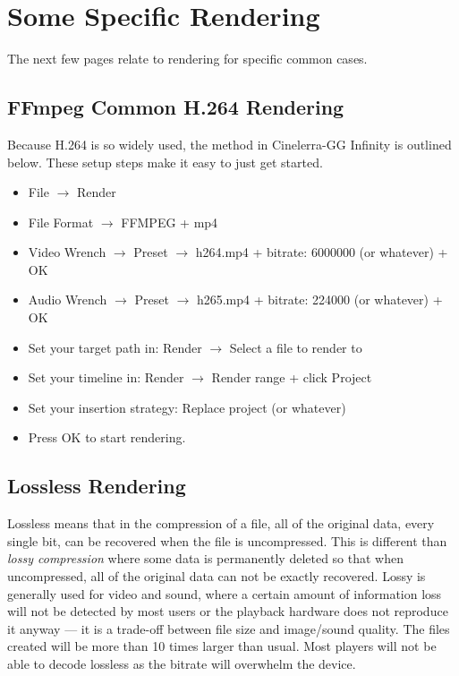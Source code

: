 \section{Some Specific Rendering}%
\label{sec:some_specific_rendering}

\noindent The next few pages relate to rendering for specific common cases.

\subsection{FFmpeg Common H.264 Rendering}%
\label{sub:ffmpeg_h264_rendering}

Because H.264 is so widely used, the method in Cinelerra-GG Infinity is outlined below.  These setup steps make it easy to just get started.

\begin{itemize}
    \item File $\rightarrow$ Render
    \item File Format $\rightarrow$ FFMPEG + mp4
    \item Video Wrench $\rightarrow$ Preset $\rightarrow$ h264.mp4 + bitrate: 6000000 (or whatever) + OK
    \item Audio Wrench $\rightarrow$ Preset $\rightarrow$ h265.mp4 + bitrate: 224000 (or whatever) + OK
    \item Set your target path in: Render $\rightarrow$ Select a file to render to
    \item Set your timeline in: Render $\rightarrow$ Render range + click Project
    \item Set your insertion strategy: Replace project (or whatever)
    \item Press OK to start rendering.
\end{itemize}

\subsection{Lossless Rendering}%
\label{sub:loseeless_rendering}

Lossless means that in the compression of a file, all of the original data, every single bit, can be recovered when the file is uncompressed.  This is different than \textit{lossy compression} where some data is permanently deleted so that when uncompressed, all of the original data can not be exactly recovered.  Lossy is generally used for video and sound, where a certain amount of information loss will not be detected by most users or the playback hardware does not reproduce it anyway --- it is a trade-off between file size and image/sound quality.  The files created will be more than 10 times larger than usual.  Most players will not be able to decode lossless as the bitrate will overwhelm the device.

